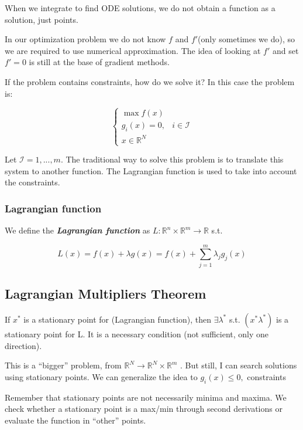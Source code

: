 When we integrate to find ODE solutions, we do not obtain a function as
a solution, just points.

In our optimization problem we do not know $f$ and $f'$(only sometimes
we do), so we are required to use numerical approximation. The idea of
looking at $f'$ and set $f'=0$ is still at the base of gradient methods.

If the problem contains constraints, how do we solve it? In this case
the problem is:

$$\left\{\begin{array}{ll}
\max f(x) &  \\
g_i(x)=0, & i \in \mathcal{I} \\
x \in \mathbb{R}^N
\end{array}\right.$$

Let $\mathcal{I}= 1,...,m$. The traditional way to solve this problem is
to translate this system to another function. The Lagrangian function is
used to take into account the constraints.

\hypertarget{lagrangian-function}{%
\subsubsection{Lagrangian function}\label{lagrangian-function}}

We define the \textbf{\emph{Lagrangian function}} as
$L: \mathbb{R}^n \times \mathbb{R}^m \rightarrow \mathbb{R}$ s.t.

$$
L(x)= f(x) + \lambda g(x) = f(x) + \sum_{j=1}^m \lambda_j g_j(x)
$$

\hypertarget{lagrangian-multipliers-theorem}{%
\subsection{Lagrangian Multipliers
Theorem}\label{lagrangian-multipliers-theorem}}

If $x^*$ is a stationary point for (Lagrangian function), then
$\exists \lambda^*$ s.t. $(x^* \lambda^*)$ is a stationary point for L. It
is a necessary condition (not sufficient, only one direction).

This is a ``bigger'' problem, from
$\mathbb{R}^N \rightarrow \mathbb{R}^N \times \mathbb{R}^m$ . But still,
I can search solutions using stationary points. We can generalize the
idea to $g_i(x) \leq 0,$ constraints

Remember that stationary points are not necessarily minima and maxima.
We check whether a stationary point is a max/min through second
derivations or evaluate the function in ``other'' points.

